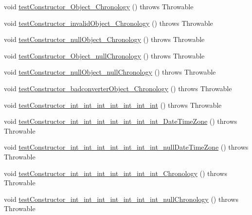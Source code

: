 \begin{DoxyCompactItemize}
\item 
void \hyperlink{classorg_1_1joda_1_1time_1_1_test_mutable_date_time___constructors_acaba03e7ce73dde8e73bc6c40807dc39}{test\-Constructor\-\_\-\-Object\-\_\-\-Chronology} ()  throws Throwable 
\item 
void \hyperlink{classorg_1_1joda_1_1time_1_1_test_mutable_date_time___constructors_aad56d0c7e3e068b35e01d82cb678ff98}{test\-Constructor\-\_\-invalid\-Object\-\_\-\-Chronology} ()  throws Throwable 
\item 
void \hyperlink{classorg_1_1joda_1_1time_1_1_test_mutable_date_time___constructors_a35e59b1c1fa4ddd676a666edea5ce403}{test\-Constructor\-\_\-null\-Object\-\_\-\-Chronology} ()  throws Throwable 
\item 
void \hyperlink{classorg_1_1joda_1_1time_1_1_test_mutable_date_time___constructors_a3970304304ec24917c79e0c44e1db284}{test\-Constructor\-\_\-\-Object\-\_\-null\-Chronology} ()  throws Throwable 
\item 
void \hyperlink{classorg_1_1joda_1_1time_1_1_test_mutable_date_time___constructors_af83bd9d54a6aaae4858a48ca25bd481a}{test\-Constructor\-\_\-null\-Object\-\_\-null\-Chronology} ()  throws Throwable 
\item 
void \hyperlink{classorg_1_1joda_1_1time_1_1_test_mutable_date_time___constructors_a99d9958c70b2cb872233cdf594f446e0}{test\-Constructor\-\_\-badconverter\-Object\-\_\-\-Chronology} ()  throws Throwable 
\item 
void \hyperlink{classorg_1_1joda_1_1time_1_1_test_mutable_date_time___constructors_a83005bc332837632401aa26fcd1a9ac8}{test\-Constructor\-\_\-int\-\_\-int\-\_\-int\-\_\-int\-\_\-int\-\_\-int\-\_\-int} ()  throws Throwable 
\item 
void \hyperlink{classorg_1_1joda_1_1time_1_1_test_mutable_date_time___constructors_afafb9c96096fdc2b30a4d12860e2b59f}{test\-Constructor\-\_\-int\-\_\-int\-\_\-int\-\_\-int\-\_\-int\-\_\-int\-\_\-int\-\_\-\-Date\-Time\-Zone} ()  throws Throwable 
\item 
void \hyperlink{classorg_1_1joda_1_1time_1_1_test_mutable_date_time___constructors_a4b9bc1596fd0e84f4716e527070e8d5d}{test\-Constructor\-\_\-int\-\_\-int\-\_\-int\-\_\-int\-\_\-int\-\_\-int\-\_\-int\-\_\-null\-Date\-Time\-Zone} ()  throws Throwable 
\item 
void \hyperlink{classorg_1_1joda_1_1time_1_1_test_mutable_date_time___constructors_abf397afab46f3f19f424d47ba73f1533}{test\-Constructor\-\_\-int\-\_\-int\-\_\-int\-\_\-int\-\_\-int\-\_\-int\-\_\-int\-\_\-\-Chronology} ()  throws Throwable 
\item 
void \hyperlink{classorg_1_1joda_1_1time_1_1_test_mutable_date_time___constructors_a0d34a1157badb7945d194be5ab7bba94}{test\-Constructor\-\_\-int\-\_\-int\-\_\-int\-\_\-int\-\_\-int\-\_\-int\-\_\-int\-\_\-null\-Chronology} ()  throws Throwable 
\end{DoxyCompactItemize}
